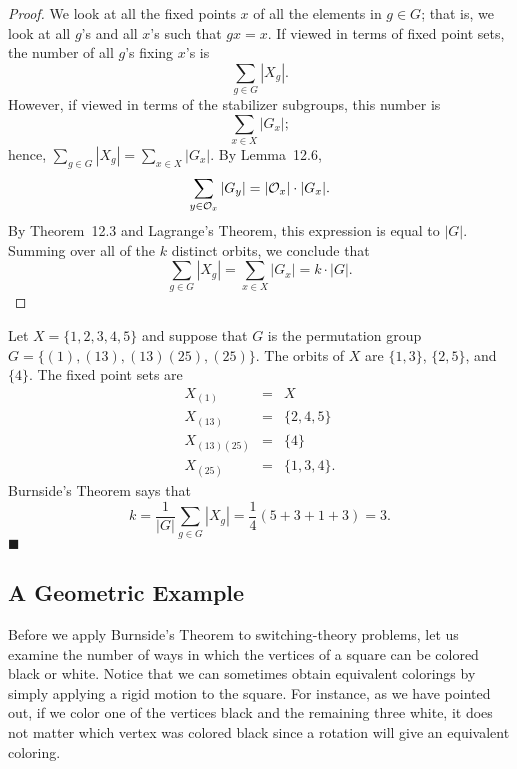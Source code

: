  
\begin{proof}
We look at all the fixed points $x$ of all the elements in $g \in G$;
that is, we look at all $g$'s and all $x$'s such that $gx =x$.
If viewed in terms of fixed point sets, the number of all $g$'s fixing
$x$'s is 
$$
\sum_{g \in G} |X_g|.
$$
However, if viewed in terms of the stabilizer subgroups, this number
is 
$$
\sum_{x \in X} |G_x|;
$$
hence, $\sum_{g \in G} |X_g| = \sum_{x \in X} |G_x|$. By Lemma~12.6, 
$$
\sum_{y \in {\cal O}_x} |G_y|  =  | {\cal O}_x| \cdot |G_x|.
$$
By Theorem~12.3 and Lagrange's Theorem, this expression is equal 
to $|G|$. Summing over all of the $k$ distinct orbits, we conclude that
$$
\sum_{g \in G} |X_g| = \sum_{x \in X} |G_x| = k \cdot |G|.
$$
\end{proof}
 
 
\medskip
 
 
Let $X = \{1, 2, 3, 4, 5 \}$ and suppose that $G$ is the permutation
group $G= \{(1), (1 3), (1 3)(2 5), (2 5) \}$. The orbits of $X$ are
$\{1, 3\}$, $\{2, 5\}$, and $\{4\}$. The fixed point sets are 
\begin{eqnarray*}
X_{(1)} & = & X \\
X_{(1 3)} & = & \{2, 4, 5 \} \\
X_{(1 3)(2 5)} & = & \{4\} \\
X_{(2 5)} & = & \{1, 3, 4 \} .
\end{eqnarray*}
Burnside's Theorem says that
$$
k = \frac{1}{|G|} \sum_{g \in G} |X_g| = \frac{1}{4}(5+
3+1+3) = 3.
$$
\hspace{\fill} $\blacksquare$
 
 
 
\subsection*{A Geometric Example}
 
 
 
Before we apply Burnside's Theorem to switching-theory problems, let
us examine the number of ways in which the vertices of a square can be
colored black or white. Notice that we can sometimes obtain equivalent
colorings by simply applying a rigid motion to the square. For
instance, as we have pointed out, if we color one of the vertices
black and the remaining three white, it does not matter which vertex
was colored black since a rotation will give an equivalent coloring.  
 
